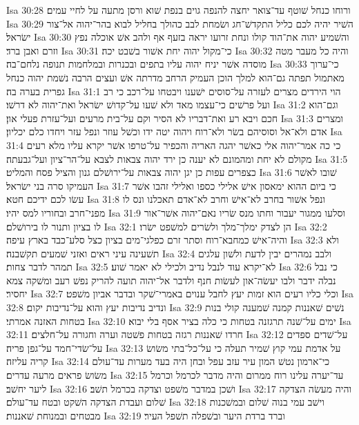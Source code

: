 Isa 30:28  ורוחו כנחל שׁוטף עד־צואר יחצה להנפה גוים בנפת שׁוא ורסן מתעה על לחיי עמים׃
Isa 30:29  השׁיר יהיה לכם כליל התקדשׁ־חג ושׂמחת לבב כהולך בחליל לבוא בהר־יהוה אל־צור ישׂראל׃
Isa 30:30  והשׁמיע יהוה את־הוד קולו ונחת זרועו יראה בזעף אף ולהב אשׁ אוכלה נפץ וזרם ואבן ברד׃
Isa 30:31  כי־מקול יהוה יחת אשׁור בשׁבט יכה׃
Isa 30:32  והיה כל מעבר מטה מוסדה אשׁר יניח יהוה עליו בתפים ובכנרות ובמלחמות תנופה נלחם־בה׃
Isa 30:33  כי־ערוך מאתמול תפתה גם־הוא למלך הוכן העמיק הרחב מדרתה אשׁ ועצים הרבה נשׁמת יהוה כנחל גפרית בערה בה׃
Isa 31:1  הוי הירדים מצרים לעזרה על־סוסים ישׁענו ויבטחו על־רכב כי רב ועל פרשׁים כי־עצמו מאד ולא שׁעו על־קדושׁ ישׂראל ואת־יהוה לא דרשׁו׃
Isa 31:2  וגם־הוא חכם ויבא רע ואת־דבריו לא הסיר וקם על־בית מרעים ועל־עזרת פעלי און׃
Isa 31:3  ומצרים אדם ולא־אל וסוסיהם בשׂר ולא־רוח ויהוה יטה ידו וכשׁל עוזר ונפל עזר ויחדו כלם יכליון׃
Isa 31:4  כי כה אמר־יהוה אלי כאשׁר יהגה האריה והכפיר על־טרפו אשׁר יקרא עליו מלא רעים מקולם לא יחת ומהמונם לא יענה כן ירד יהוה צבאות לצבא על־הר־ציון ועל־גבעתה׃
Isa 31:5  כצפרים עפות כן יגן יהוה צבאות על־ירושׁלם גנון והציל פסח והמליט׃
Isa 31:6  שׁובו לאשׁר העמיקו סרה בני ישׂראל׃
Isa 31:7  כי ביום ההוא ימאסון אישׁ אלילי כספו ואלילי זהבו אשׁר עשׂו לכם ידיכם חטא׃
Isa 31:8  ונפל אשׁור בחרב לא־אישׁ וחרב לא־אדם תאכלנו ונס לו מפני־חרב ובחוריו למס יהיו׃
Isa 31:9  וסלעו ממגור יעבור וחתו מנס שׂריו נאם־יהוה אשׁר־אור לו בציון ותנור לו בירושׁלם׃
Isa 32:1  הן לצדק ימלך־מלך ולשׂרים למשׁפט ישׂרו׃
Isa 32:2  והיה־אישׁ כמחבא־רוח וסתר זרם כפלגי־מים בציון כצל סלע־כבד בארץ עיפה׃
Isa 32:3  ולא תשׁעינה עיני ראים ואזני שׁמעים תקשׁבנה׃
Isa 32:4  ולבב נמהרים יבין לדעת ולשׁון עלגים תמהר לדבר צחות׃
Isa 32:5  לא־יקרא עוד לנבל נדיב ולכילי לא יאמר שׁוע׃
Isa 32:6  כי נבל נבלה ידבר ולבו יעשׂה־און לעשׂות חנף ולדבר אל־יהוה תועה להריק נפשׁ רעב ומשׁקה צמא יחסיר׃
Isa 32:7  וכלי כליו רעים הוא זמות יעץ לחבל ענוים באמרי־שׁקר ובדבר אביון משׁפט׃
Isa 32:8  ונדיב נדיבות יעץ והוא על־נדיבות יקום׃
Isa 32:9  נשׁים שׁאננות קמנה שׁמענה קולי בנות בטחות האזנה אמרתי׃
Isa 32:10  ימים על־שׁנה תרגזנה בטחות כי כלה בציר אסף בלי יבוא׃
Isa 32:11  חרדו שׁאננות רגזה בטחות פשׁטה וערה וחגורה על־חלצים׃
Isa 32:12  על־שׁדים ספדים על־שׂדי־חמד על־גפן פריה׃
Isa 32:13  על אדמת עמי קוץ שׁמיר תעלה כי על־כל־בתי משׂושׂ קריה עליזה׃
Isa 32:14  כי־ארמון נטשׁ המון עיר עזב עפל ובחן היה בעד מערות עד־עולם משׂושׂ פראים מרעה עדרים׃
Isa 32:15  עד־יערה עלינו רוח ממרום והיה מדבר לכרמל וכרמל ליער יחשׁב׃
Isa 32:16  ושׁכן במדבר משׁפט וצדקה בכרמל תשׁב׃
Isa 32:17  והיה מעשׂה הצדקה שׁלום ועבדת הצדקה השׁקט ובטח עד־עולם׃
Isa 32:18  וישׁב עמי בנוה שׁלום ובמשׁכנות מבטחים ובמנוחת שׁאננות׃
Isa 32:19  וברד ברדת היער ובשׁפלה תשׁפל העיר׃
